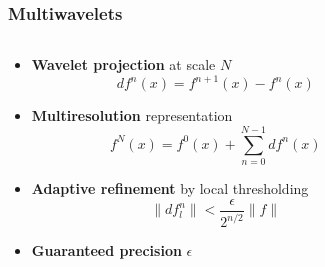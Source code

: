 \begin{frame}
    \frametitle{Multiwavelets}
    \scriptsize
    \begin{columns}
    \begin{column}[b]{0.58\linewidth}
    \begin{itemize}
        \item   \textbf{Wavelet projection} at scale $N$
	    \begin{equation}
	        \nonumber
	        df^n(x) = f^{n+1}(x) - f^{n}(x)
	    \end{equation}
        \item   \textbf{Multiresolution} representation
	    \begin{equation}
	        \nonumber
	        f^N(x) = f^{0}(x) + \sum_{n=0}^{N-1} df^{n}(x)
	    \end{equation}
        \pause
        \item   \textbf{Adaptive refinement} by local thresholding
	    \begin{equation}
	        \nonumber
	        \|df_l^n\| < \frac{\epsilon}{2^{n/2}}\|f\|
	    \end{equation}
        \item   \textbf{Guaranteed precision} $\epsilon$
    \end{itemize}
    \vspace{3mm}
    \end{column}
    \begin{column}[b]{0.42\linewidth}
    \centering
\end{column}
\end{columns}
\end{frame}
